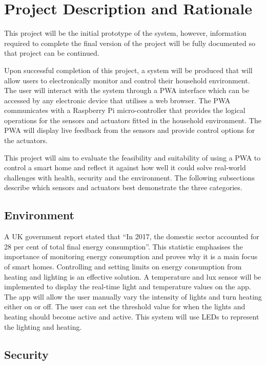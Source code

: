 \documentclass[final]{cmpreport}
\begin{document}
    
\section{Project Description and Rationale}

This project will be the initial prototype of the system, however, information required to complete the final version of the project will be fully documented so that project can be continued.

Upon successful completion of this project, a system will be produced that will allow users to electronically monitor and control their household environment. The user will interact with the system through a PWA interface which can be accessed by any electronic device that utilises a web browser. The PWA communicates with a Raspberry Pi micro-controller that provides the logical operations for the sensors and actuators fitted in the household environment. The PWA will display live feedback from the sensors and provide control options for the actuators.

This project will aim to evaluate the feasibility and suitability of using a PWA to control a smart home and reflect it against how well it could solve real-world challenges with health, security and the environment. The following subsections describe which sensors and actuators best demonstrate the three categories. 

    \subsection{Environment}
    
    A UK government report \citep{ukenergy} stated that ``In 2017, the domestic sector accounted for 28 per cent of total final energy consumption''. This statistic emphasises the importance of monitoring energy consumption and proves why it is a main focus of smart homes. Controlling and setting limits on energy consumption from heating and lighting is an effective solution. A temperature and lux sensor will be implemented to display the real-time light and temperature values on the app. The app will allow the user manually vary the intensity of lights and turn heating either on or off. The user can set the threshold value for when the lights and heating should become active and active. This system will use LEDs to represent the lighting and heating.

    \subsection{Security}
    
\end{document}
